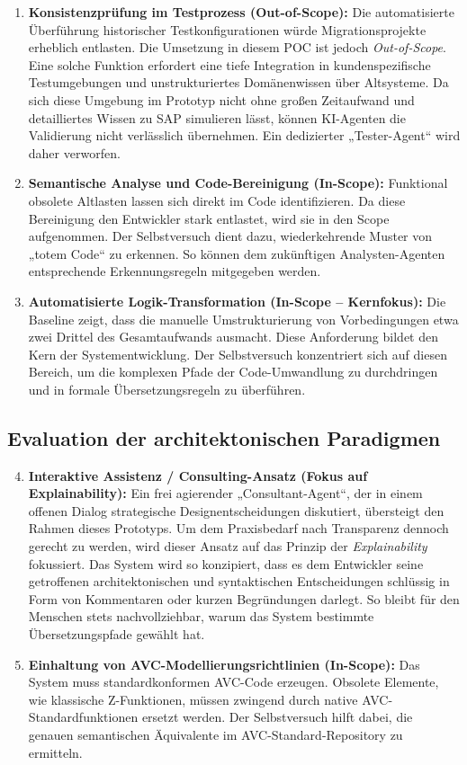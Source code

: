 \begin{enumerate}
\item \textbf{Konsistenzprüfung im Testprozess (Out-of-Scope):}
Die automatisierte Überführung historischer Testkonfigurationen würde Migrationsprojekte erheblich entlasten. Die Umsetzung in diesem \ac{POC} ist jedoch \textit{Out-of-Scope}. Eine solche Funktion erfordert eine tiefe Integration in kundenspezifische Testumgebungen und unstrukturiertes Domänenwissen über Altsysteme. Da sich diese Umgebung im Prototyp nicht ohne großen Zeitaufwand und detailliertes Wissen zu SAP simulieren lässt, können \ac{KI}-Agenten die Validierung nicht verlässlich übernehmen. Ein dedizierter „Tester-Agent“ wird daher verworfen.

\item \textbf{Semantische Analyse und Code-Bereinigung (In-Scope):} 
Funktional obsolete Altlasten lassen sich direkt im Code identifizieren. Da diese Bereinigung den Entwickler stark entlastet, wird sie in den Scope aufgenommen. Der Selbstversuch dient dazu, wiederkehrende Muster von „totem Code“ zu erkennen. So können dem zukünftigen Analysten-Agenten entsprechende Erkennungsregeln mitgegeben werden.

\item \textbf{Automatisierte Logik-Transformation (In-Scope -- Kernfokus):} 
Die Baseline zeigt, dass die manuelle Umstrukturierung von Vorbedingungen etwa zwei Drittel des Gesamtaufwands ausmacht. Diese Anforderung bildet den Kern der Systementwicklung. Der Selbstversuch konzentriert sich auf diesen Bereich, um die komplexen Pfade der Code-Umwandlung zu durchdringen und in formale Übersetzungsregeln zu überführen.
\end{enumerate}

\subsection{Evaluation der architektonischen Paradigmen}

\begin{enumerate}
\setcounter{enumii}{3}
\item \textbf{Interaktive Assistenz / Consulting-Ansatz (Fokus auf Explainability):}
Ein frei agierender „Consultant-Agent“, der in einem offenen Dialog strategische Designentscheidungen diskutiert, übersteigt den Rahmen dieses Prototyps. Um dem Praxisbedarf nach Transparenz dennoch gerecht zu werden, wird dieser Ansatz auf das Prinzip der \textit{Explainability} fokussiert. Das System wird so konzipiert, dass es dem Entwickler seine getroffenen architektonischen und syntaktischen Entscheidungen schlüssig in Form von Kommentaren oder kurzen Begründungen darlegt. So bleibt für den Menschen stets nachvollziehbar, warum das System bestimmte Übersetzungspfade gewählt hat. 
\item \textbf{Einhaltung von \ac{AVC}-Modellierungsrichtlinien (In-Scope):} 
Das System muss standardkonformen \ac{AVC}-Code erzeugen. Obsolete Elemente, wie klassische Z-Funktionen, müssen zwingend durch native \ac{AVC}-Standardfunktionen ersetzt werden. Der Selbstversuch hilft dabei, die genauen semantischen Äquivalente im \ac{AVC}-Standard-Repository zu ermitteln.
\end{enumerate}


